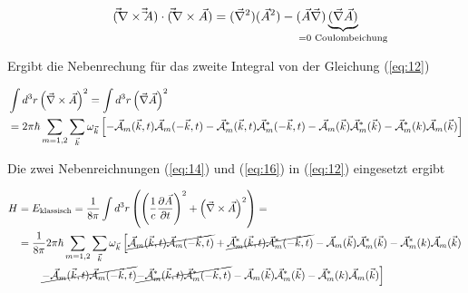 \begin{align}
  \label{eq:17}
  (\vec \vec \nabla\times\vec \vec A)\cdot(\vec \vec \nabla\times\vec A) = (\vec\nabla^2)(\vec A^2) - (\vec A\vec \nabla)\underbr{(\vec \nabla\vec A)}_{=0\text{ Coulombeichung}}
\end{align}

Ergibt die Nebenrechung für das zweite Integral von der Gleichung (\ref{eq:12})

\begin{align}
  \label{eq:16}
   &\int d^3r  \left(\vec \nabla\times\vec A\right)^2 = \int d^3r  \left( \vec \nabla \vec A \right)^2 \notag\\
&=  2\pi\hbar \sum_{m=1,2} \sum_{\vec k} \omega_{\vec k}  \left[ - \vec{\mathcal A}_m (\vec k,t) \vec{\mathcal A}_{m} (- \vec k,t)   
-  \vec{\mathcal A}^*_m (\vec k,t) \vec{\mathcal A}^*_{m} (- \vec k,t) 
- \vec{\mathcal A}_{m} (\vec k)  \vec{\mathcal A}^*_{m} (\vec k)  
- \vec{\mathcal A}^*_m (k) \vec{\mathcal A}_{m} (\vec k)  \right] \notag\\
\end{align}


Die zwei Nebenreichnungen (\ref{eq:14}) und (\ref{eq:16}) in (\ref{eq:12}) eingesetzt ergibt

\begin{align}
  \label{eq:18}
   H&=E_{\text{klassisch}} = \frac{1}{8\pi} \int d^3r \left( \left( \frac{1}{c} \pdiff{\vec A}_t \right)^2 + \left(\vec \nabla\times\vec A\right)^2 \right) = \notag\\
&=  \frac{1}{8\pi} 2\pi\hbar \sum_{m=1,2} \sum_{\vec k} \omega_{\vec k}  
\left[ \cancel{\vec{\mathcal A}_m (\vec k,t) \vec{\mathcal A}_{m} (- \vec k,t)}   + 
  \cancel{\vec{\mathcal A}^*_m (\vec k,t) \vec{\mathcal A}^*_{m} (- \vec k,t)}  
 - \vec{\mathcal A}_{m} (\vec k)  \vec{\mathcal A}^*_{m} (\vec k) 
 - \vec{\mathcal A}^*_m (k) \vec{\mathcal A}_{m} (\vec k)  \right. \notag\\
&\qquad\left. \cancel{ - \vec{\mathcal A}_m (\vec k,t) \vec{\mathcal A}_{m} (- \vec k,t)}  
\cancel{-  \vec{\mathcal A}^*_m (\vec k,t) \vec{\mathcal A}^*_{m} (- \vec k,t)}
- \vec{\mathcal A}_{m} (\vec k)  \vec{\mathcal A}^*_{m} (\vec k)  
- \vec{\mathcal A}^*_m (k) \vec{\mathcal A}_{m} (\vec k)  \right]
\end{align}





